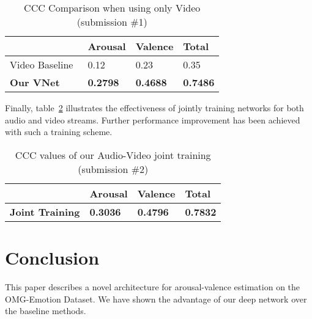 \documentclass[a4paper, 10pt, conference]{ieeeconf}      %
\begin{document}
\begin{table}[!ht]
\centering
\caption{CCC Comparison when using only Video (submission \#1)}
\label{tab:video}
\begin{tabular}{l|l|l|l}
\hline
                           & Arousal & Valence & Total  \\ \hline\hline
Video Baseline~\cite{barros2016developing}             & 0.12    & 0.23    & 0.35   \\ \hline
\textbf{Our VNet}      & \textbf{0.2798}  & \textbf{0.4688}  & \textbf{0.7486} \\ \hline
\end{tabular}
\end{table}

Finally, table~\ref{tab:joint} illustrates the effectiveness of jointly training networks for both audio and video streams. Further performance improvement has been achieved with such a training scheme.
\begin{table}[!ht]
\centering
\caption{CCC values of our Audio-Video joint training (submission \#2)}
\label{tab:joint}
\begin{tabular}{l|l|l|l}
\hline
                           & Arousal & Valence & Total  \\ \hline\hline
\textbf{Joint Training}    & \textbf{0.3036}  & \textbf{0.4796}  & \textbf{0.7832} \\ \hline
\end{tabular}
\end{table}

\section{Conclusion}
\label{sec:con}
This paper describes a novel architecture for arousal-valence estimation on the OMG-Emotion Dataset.
We have shown the advantage of our deep network over the baseline methods.




\end{document}
